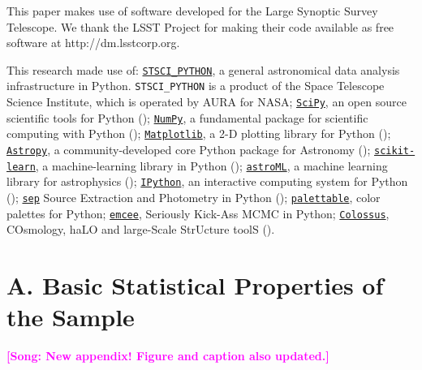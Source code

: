 \documentclass{emulateapj}
\newcommand{\song}[1]{\textcolor{magenta}{\textbf{[Song: #1]}}}
\begin{document}
\begin{CJK*}{UTF8}{gbsn}
  This paper makes use of software developed for the Large Synoptic Survey 
  Telescope. We thank the LSST Project for making their code available as free 
  software at http://dm.lsstcorp.org.
 
  This research made use of:
  \href{http://www.stsci.edu/institute/software_hardware/pyraf/stsci\_python}{\texttt{STSCI\_PYTHON}},
      a general astronomical data analysis infrastructure in Python. 
      \texttt{STSCI\_PYTHON} is a product of the Space Telescope Science Institute, 
      which is operated by AURA for NASA;
  \href{http://www.scipy.org/}{\texttt{SciPy}},
      an open source scientific tools for Python (\citealt{SciPy});
  \href{http://www.numpy.org/}{\texttt{NumPy}}, 
      a fundamental package for scientific computing with Python (\citealt{NumPy});
  \href{http://matplotlib.org/}{\texttt{Matplotlib}}, 
      a 2-D plotting library for Python (\citealt{Matplotlib});
  \href{http://www.astropy.org/}{\texttt{Astropy}}, a community-developed 
      core Python package for Astronomy (\citealt{AstroPy}); 
  \href{http://scikit-learn.org/stable/index.html}{\texttt{scikit-learn}},
      a machine-learning library in Python (\citealt{scikit-learn}); 
  \href{http://www.astroml.org/}{\texttt{astroML}}, 
      a machine learning library for astrophysics (\citealt{astroML});
  \href{https://ipython.org}{\texttt{IPython}}, 
      an interactive computing system for Python (\citealt{IPython});
  \href{https://github.com/kbarbary/sep}{\texttt{sep}} 
      Source Extraction and Photometry in Python (\citealt{PythonSEP});
  \href{https://jiffyclub.github.io/palettable/}{\texttt{palettable}},
      color palettes for Python;
  \href{http://dan.iel.fm/emcee/current/}{\texttt{emcee}}, 
      Seriously Kick-Ass MCMC in Python;
  \href{http://bdiemer.bitbucket.org/}{\texttt{Colossus}}, 
      COsmology, haLO and large-Scale StrUcture toolS (\citealt{Colossus}).





\appendix


\section{A. Basic Statistical Properties of the Sample} 
	\label{app:basic}
    \song{New appendix! Figure and caption also updated.}


\end{CJK*}
\end{document}
